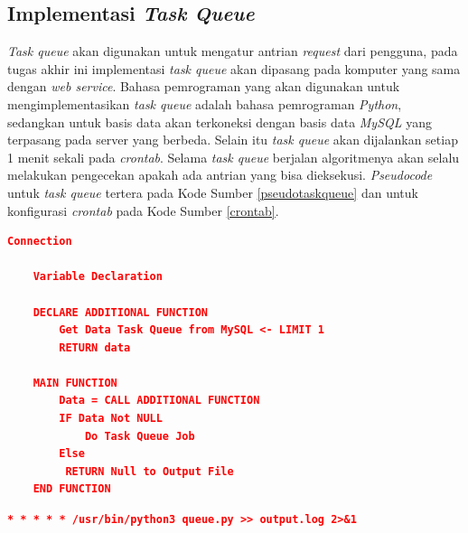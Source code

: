 		\subsection{Implementasi \textit{Task Queue}}
			\textit{Task queue} akan digunakan untuk mengatur antrian \textit{request} dari pengguna, pada tugas akhir ini implementasi \textit{task queue} akan dipasang pada komputer yang sama dengan \textit{web service}. Bahasa pemrograman yang akan digunakan untuk mengimplementasikan \textit{task queue} adalah bahasa pemrograman \textit{Python}, sedangkan untuk basis data akan terkoneksi dengan basis data \textit{MySQL} yang terpasang pada server yang berbeda. Selain itu \textit{task queue} akan dijalankan setiap 1 menit sekali pada \textit{crontab}. Selama \textit{task queue} berjalan algoritmenya akan selalu melakukan pengecekan apakah ada antrian yang bisa dieksekusi. \textit{Pseudocode} untuk \textit{task queue} tertera pada Kode Sumber \ref{pseudotaskqueue} dan untuk konfigurasi \textit{crontab} pada Kode Sumber \ref{crontab}.
			
			\begin{lstlisting}[frame=single,tabsize=2,breaklines,caption={\textit{Pseudocode task queue} },label=pseudotaskqueue, captionpos=b, language=json]
	Connection
	
	Variable Declaration

	DECLARE ADDITIONAL FUNCTION
		Get Data Task Queue from MySQL <- LIMIT 1
		RETURN data
	
	MAIN FUNCTION
		Data = CALL ADDITIONAL FUNCTION
		IF Data Not NULL
			Do Task Queue Job
		Else
		 RETURN Null to Output File
	END FUNCTION
			\end{lstlisting}
			
			\begin{lstlisting}[frame=single,tabsize=2,breaklines,caption={Konfigurasi \textit{crontab} },label=crontab, captionpos=b, language=json]
	* * * * * /usr/bin/python3 queue.py >> output.log 2>&1
			\end{lstlisting}